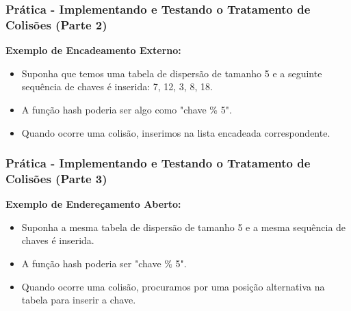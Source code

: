 \begin{frame}[fragile]
  \frametitle{Prática - Implementando e Testando o Tratamento de Colisões (Parte 2)}
  \textbf{Exemplo de Encadeamento Externo:}
  \begin{itemize}
    \item Suponha que temos uma tabela de dispersão de tamanho 5 e a seguinte sequência de chaves é inserida: 7, 12, 3, 8, 18.
    \item A função hash poderia ser algo como "chave \% 5".
    \item Quando ocorre uma colisão, inserimos na lista encadeada correspondente.
  \end{itemize}
\end{frame}
\begin{frame}[fragile]
  \frametitle{Prática - Implementando e Testando o Tratamento de Colisões (Parte 3)}
  \textbf{Exemplo de Endereçamento Aberto:}
  \begin{itemize}
    \item Suponha a mesma tabela de dispersão de tamanho 5 e a mesma sequência de chaves é inserida.
    \item A função hash poderia ser "chave \% 5".
    \item Quando ocorre uma colisão, procuramos por uma posição alternativa na tabela para inserir a chave.
  \end{itemize}
\end{frame}

